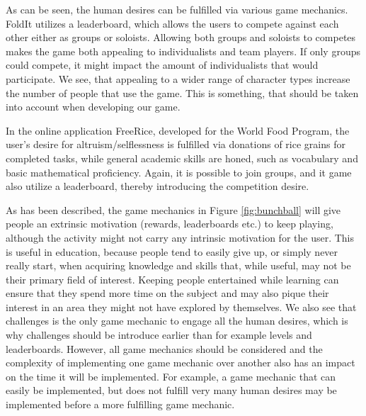 As can be seen, the human desires can be fulfilled via various game mechanics.
FoldIt utilizes a leaderboard, which allows the users to compete against each other either as groups or soloists. Allowing both groups and soloists to competes makes the game both appealing to individualists and team players. If only groups could compete, it might impact the amount of individualists that would participate. We see, that appealing to a wider range of character types increase the number of people that use the game. This is something, that should be taken into account when developing our game.\newline

In the online application FreeRice, developed for the World Food Program, the user's desire for altruism/selflessness is fulfilled via donations of rice grains for completed tasks, while general academic skills are honed, such as vocabulary and basic mathematical proficiency. Again, it is possible to join groups, and it game also utilize a leaderboard, thereby introducing the competition desire.\cite{freerice}\newline

As has been described, the game mechanics in Figure \ref{fig:bunchball} will give people an extrinsic motivation (rewards, leaderboards etc.) to keep playing, although the activity might not carry any intrinsic motivation for the user. This is useful in education, because people tend to easily give up, or simply never really start, when acquiring knowledge and skills that, while useful, may not be their primary field of interest. Keeping people entertained while learning can ensure that they spend more time on the subject and may also pique their interest in an area they might not have explored by themselves. We also see that challenges is the only game mechanic to engage all the human desires, which is why challenges should be introduce earlier than for example levels and leaderboards. However, all game mechanics should be considered and the complexity of implementing one game mechanic over another also has an impact on the time it will be implemented. For example, a game mechanic that can easily be implemented, but does not fulfill very many human desires may be implemented before a more fulfilling game mechanic.
